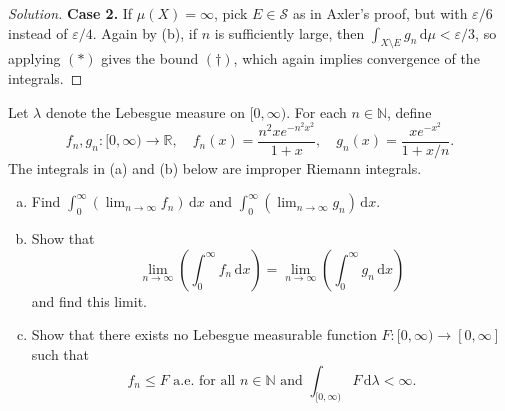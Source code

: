 \documentclass[10pt]{article}
\newcommand{\dd}{\,\mathrm{d}}
\providecommand{\eps}{\varepsilon}
\providecommand{\NN}{\mathbb N}
\providecommand{\RR}{\mathbb R}
\providecommand{\ii}{\item}
\newenvironment{soln}{\begin{proof}[Solution]}{\end{proof}}
\begin{document}
\begin{soln}
    \textbf{Case 2.} If $\mu(X) = \infty$,
    pick $E\in\mathcal S$ as in Axler's proof, but with $\eps/6$ instead of $\eps/4$.
    Again by (b), if $n$ is sufficiently large, then
    $\int_{X\setminus E}g_n\dd\mu < \eps/3$,
    so applying $(\ast)$ gives the bound $(\dagger)$,
    which again implies convergence of the integrals.
\end{soln}

\pagebreak

\begin{problem}
    Let $\lambda$ denote the Lebesgue measure on $[0,\infty)$.
    For each $n\in\NN$, define
    \begin{equation*}
	f_n,g_n\colon[0,\infty)\to\RR,\quad
	f_n(x) = \frac{n^2xe^{-n^2x^2}}{1+x},\quad
	g_n(x) = \frac{xe^{-x^2}}{1 + x/n}.
    \end{equation*}
    The integrals in (a) and (b) below are improper Riemann integrals.
    \begin{enumerate}[(a)]
	\ii Find $\int_0^\infty (\lim_{n\to\infty}f_n)\dd x$ and
	$\int_0^\infty (\lim_{n\to\infty}g_n)\dd x$.
	\ii Show that
	\begin{equation*}
	    \lim_{n\to\infty}\left(\int_0^\infty f_n\dd x\right)
	    = \lim_{n\to\infty}\left(\int_0^\infty g_n\dd x\right)
	\end{equation*}
	and find this limit.
	\ii Show that there exists no Lebesgue measurable function
	$F\colon[0,\infty)\to[0,\infty]$ such that
	\begin{equation*}
	    f_n\le F\text{ a.e. for all $n\in\NN$ and }
	    \int_{[0,\infty)}F\dd\lambda<\infty.
	\end{equation*}
\end{enumerate}
\end{problem}
\end{document}

